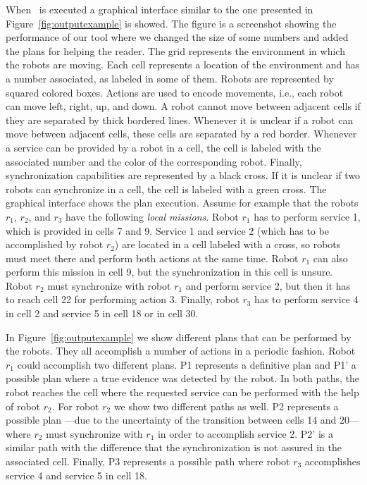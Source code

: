 
When  \toolName\ is executed a graphical interface similar to the one presented  in Figure~\ref{fig:outputexample} is showed.
The figure is a screenshot showing the performance of our tool where we changed the size of some numbers and added the plans for helping the reader.
The grid represents the environment in which the robots are moving.
Each cell represents a location of the environment and has a number associated, as labeled in some of them.
Robots are represented by squared colored boxes.
Actions are used to encode movements, i.e., each robot can move left, right, up, and down.
A robot  cannot move between adjacent cells if they are separated by thick bordered lines.
Whenever  it is unclear if a robot can move between adjacent cells, these cells are separated by a red border.
Whenever a service can be provided by a robot in a cell, the cell is labeled with the associated number and the color of the corresponding robot.
Finally, synchronization capabilities are represented by a black cross.
If it is unclear if two robots can synchronize in a cell, the cell is labeled with a green cross.
The graphical interface shows the plan execution.
Assume for example that the robots $r_1$, $r_2$, and $r_3$ have the following \emph{local missions}.
Robot $r_1$ has to perform service 1, which is provided in cells 7 and 9.
Service 1 and service 2 (which has to be accomplished by robot $r_2$) are located in a cell labeled with a cross, so robots must meet there and perform both actions at the same time.
Robot $r_1$ can also perform this mission in cell 9, but the synchronization in this cell is unsure.
Robot $r_2$ must synchronize with robot $r_1$ and perform service 2, but then it has to reach cell 22 for performing action 3.
Finally, robot $r_3$ has to perform service 4 in cell 2 and service 5 in cell 18 or in cell 30.

In Figure~\ref{fig:outputexample} we show different plans that can be performed by the robots. 
They all accomplish a number of actions in a periodic fashion.
Robot $r_1$ could accomplish two different plans.
P1 represents a definitive plan and P1' a possible plan where a true evidence was detected by the robot.
In both paths, the robot reaches the cell where the requested service can be performed with the help of robot $r_2$.
For robot $r_2$ we show two different paths as well.
P2 represents a possible plan ---due to the uncertainty of the transition between cells 14 and 20--- where $r_2$ must synchronize with $r_1$ in order to accomplish service 2.
P2' is a similar path with the difference that the synchronization is not assured in the associated cell.
Finally, P3 represents a possible path where robot $r_3$ accomplishes service 4 and service 5 in cell 18.

